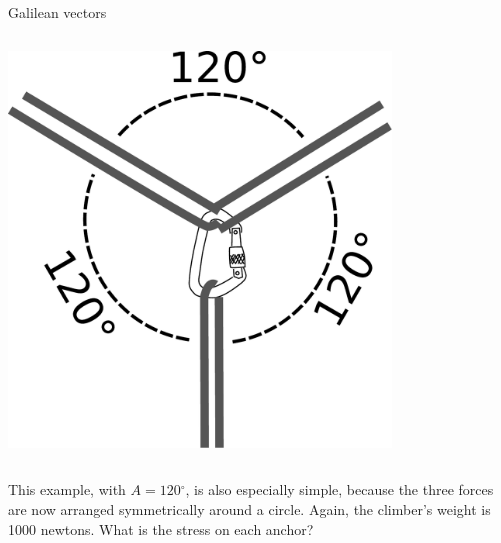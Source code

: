 \begin{frame}{Galilean vectors}


  \begin{mycolumns}

    \begin{column}{.4\textwidth}\includegraphics[width=4in]{ch04/figs/anchor-3}\end{column}

    \begin{column}{.6\textwidth}

      \newcommand{\degunit}{\ensuremath{\mspace{0mu}^\circ}}

      This example, with $A=120\degunit$, is also especially simple, because the three forces are now
      arranged symmetrically around a circle. Again, the climber's weight is 1000 newtons. What is the
      stress on each anchor?

    \end{column}
  \end{mycolumns}

\end{frame}

